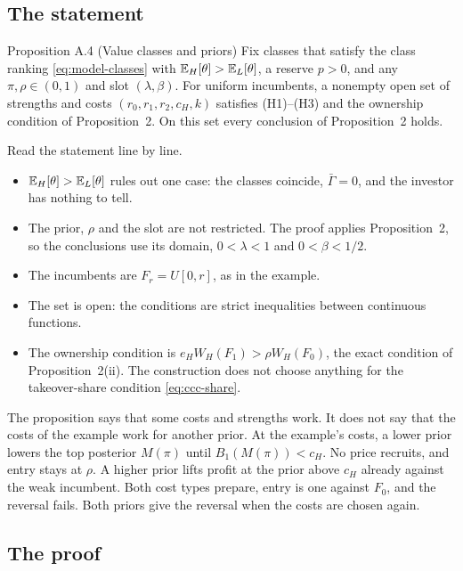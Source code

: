 \subsection{The statement}

\begin{paperresult}{Proposition A.4 (Value classes and priors)}
Fix classes that satisfy the class ranking \eqref{eq:model-classes} with \(\mathbb{E}_H[\theta]>\mathbb{E}_L[\theta]\), a reserve \(p>0\), and any \(\pi,\rho\in(0,1)\) and slot \((\lambda,\beta)\). For uniform incumbents, a nonempty open set of strengths and costs \((r_0,r_1,r_2,c_H,k)\) satisfies (H1)--(H3) and the ownership condition of Proposition~2. On this set every conclusion of Proposition~2 holds.
\end{paperresult}

Read the statement line by line.
\begin{itemize}
\item \(\mathbb{E}_H[\theta]>\mathbb{E}_L[\theta]\) rules out one case: the classes coincide, \(\bar\Gamma=0\), and the investor has nothing to tell.
\item The prior, \(\rho\) and the slot are not restricted. The proof applies Proposition~2, so the conclusions use its domain, \(0<\lambda<1\) and \(0<\beta<1/2\).
\item The incumbents are \(F_r=U[0,r]\), as in the example.
\item The set is open: the conditions are strict inequalities between continuous functions.
\item The ownership condition is \(e_HW_H(F_1)>\rho W_H(F_0)\), the exact condition of Proposition~2(ii). The construction does not choose anything for the takeover-share condition \eqref{eq:ccc-share}.
\end{itemize}

\begin{watchout}
The proposition says that some costs and strengths work. It does not say that the costs of the example work for another prior.
At the example's costs, a lower prior lowers the top posterior \(M(\pi)\) until \(B_1(M(\pi))<c_H\). No price recruits, and entry stays at \(\rho\).
A higher prior lifts profit at the prior above \(c_H\) already against the weak incumbent. Both cost types prepare, entry is one against \(F_0\), and the reversal fails.
Both priors give the reversal when the costs are chosen again.
\end{watchout}

\subsection{The proof}

